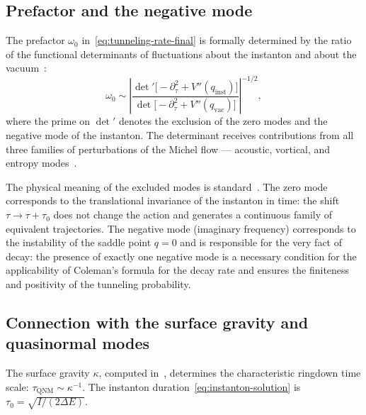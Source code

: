 \documentclass[12pt,a4paper,preprint]{elsarticle}
\begin{document}
        \subsection{Prefactor and the negative mode}\label{subsec:prefactor}
            The prefactor $\omega_{0}$ in~\eqref{eq:tunneling-rate-final} is formally determined by the ratio of the functional determinants of fluctuations about the instanton and about the vacuum~\cite{ColemanS_AspectsOfSymmetry_1985}:
            \begin{equation}
                \omega_{0} \sim \left|\frac{\det'\bigl[-\partial_{\tau}^{2} + V''(q_{\mathrm{inst}})\bigr]}{\det\bigl[-\partial_{\tau}^{2} + V''(q_{\mathrm{vac}})\bigr]}\right|^{-1/2},
                \label{eq:prefactor-determinant}
            \end{equation}
            where the prime on $\det'$ denotes the exclusion of the zero modes and the negative mode of the instanton. The determinant receives contributions from all three families of perturbations of the Michel flow --- acoustic, vortical, and entropy modes~\cite{SemyannikovAV_PerturbationSpectrumOfMichelFlowAcousticVorticalAndEntropyModes_2026}.
            
            The physical meaning of the excluded modes is standard~\cite{ColemanS_AspectsOfSymmetry_1985}. The zero mode corresponds to the translational invariance of the instanton in time: the shift $\tau \to \tau + \tau_{0}$ does not change the action and generates a continuous family of equivalent trajectories. The negative mode (imaginary frequency) corresponds to the instability of the saddle point $q = 0$ and is responsible for the very fact of decay: the presence of exactly one negative mode is a necessary condition for the applicability of Coleman's formula for the decay rate and ensures the finiteness and positivity of the tunneling probability.

        \subsection{Connection with the surface gravity and quasinormal modes}\label{subsec:kappa-connection}
            The surface gravity $\kappa$, computed in~\cite{SemyannikovAV_AcousticGeometryAndSoundRayDynamicsInRelativisticSphericalAccretion_2026}, determines the characteristic ringdown time scale: $\tau_{\mathrm{QNM}} \sim \kappa^{-1}$. The instanton duration~\eqref{eq:instanton-solution} is $\tau_{0} = \sqrt{I/(2\Delta E)}$.
            
\end{document}
